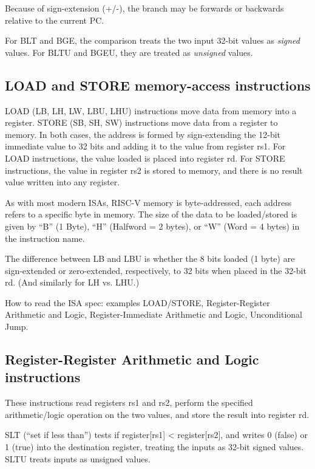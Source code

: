 Because of sign-extension (+/-), the branch may be forwards or
backwards relative to the current PC.

For BLT and BGE, the comparison treats the two input 32-bit values as
\emph{signed} values.  For BLTU and BGEU, they are treated as
\emph{unsigned} values.


\subsection{LOAD and STORE memory-access instructions}

LOAD (LB, LH, LW, LBU, LHU) instructions move data from memory into a
register.  STORE (SB, SH, SW) instructions move data from a register
to memory.  In both cases, the address is formed by sign-extending the
12-bit immediate value to 32 bits and adding it to the value from
register rs1.  For LOAD instructions, the value loaded is placed into
register rd.  For STORE instructions, the value in register rs2 is
stored to memory, and there is no result value written into any
register.

As with most modern ISAs, RISC-V memory is byte-addressed, {\ie} each
address refers to a specific byte in memory.  The size of the data to
be loaded/stored is given by ``B'' (1 Byte), ``H'' (Halfword = 2
bytes), or ``W'' (Word = 4 bytes) in the instruction name.

The difference between LB and LBU is whether the 8 bits loaded (1
byte) are sign-extended or zero-extended, respectively, to 32 bits
when placed in the 32-bit rd. (And similarly for LH vs. LHU.)

How to read the ISA spec: examples LOAD/STORE, Register-Register
Arithmetic and Logic, Register-Immediate Arithmetic and Logic,
Unconditional Jump.


\subsection{Register-Register Arithmetic and Logic instructions}

These instructions read registers rs1 and rs2, perform the specified
arithmetic/logic operation on the two values, and store the result
into register rd.

SLT (``set if less than'') tests if register[rs1] < register[rs2], and
writes 0 (false) or 1 (true) into the destination register, treating
the inputs as 32-bit signed values.  SLTU treats inputs as unsigned
values.

